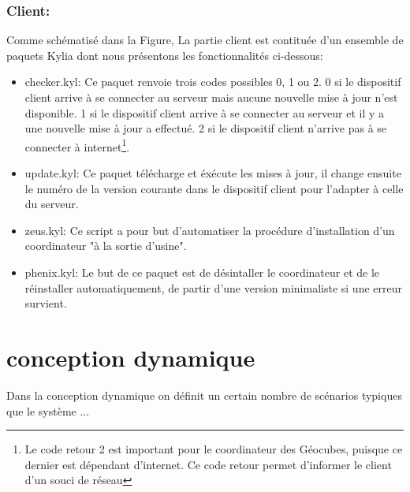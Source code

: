 \documentclass{themeensg}
\begin{document}
\subsubsection{Client:}
Comme schématisé dans la Figure, La partie client est contituée d'un ensemble de paquets Kylia dont nous présentons les fonctionnalités ci-dessous:
\begin{itemize}
\item checker.kyl: Ce paquet renvoie trois codes possibles 0, 1 ou 2. 0 si le dispositif client arrive à se connecter au serveur mais aucune nouvelle mise à jour n'est disponible. 1 si le dispositif client arrive à se connecter au serveur et il y a une nouvelle mise à jour a effectué. 2 si le dispositif client n'arrive pas à se connecter à internet\footnote{Le code retour 2 est important pour le coordinateur des Géocubes, puisque ce dernier est dépendant d'internet. Ce code retour permet d'informer le client d'un souci de réseau}.
\item update.kyl: Ce paquet télécharge et éxécute les mises à jour, il change ensuite le numéro de la version courante dans le dispositif client pour l'adapter à celle du serveur.
\item zeus.kyl: Ce script a pour but d'automatiser la procédure d'installation d'un coordinateur "à la sortie d'usine".
\item phenix.kyl: Le but de ce paquet est de désintaller le coordinateur et de le réinstaller automatiquement, de partir d'une version minimaliste si une erreur survient.
\end{itemize}
\section{conception dynamique}
Dans la conception dynamique on définit un certain nombre de scénarios typiques que le système ... 
\end{document}
